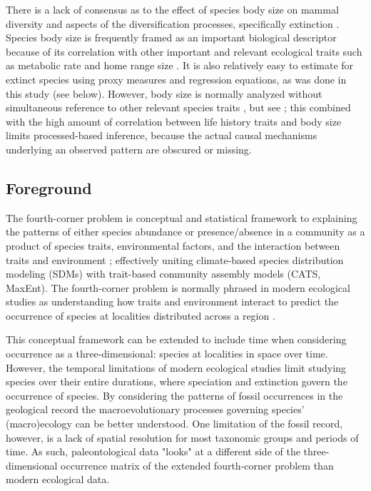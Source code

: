 \documentclass[12pt,letterpaper]{article}
\begin{document}
There is a lack of consensus as to the effect of species body size on mammal diversity and aspects of the diversification processes, specifically extinction \citep{Liow2008,Liow2009,Tomiya2013,Smits2015b}. Species body size is frequently framed as an important biological descriptor because of its correlation with other important and relevant ecological traits such as metabolic rate and home range size \citep{Brown1995}. It is also relatively easy to estimate for extinct species using proxy measures and regression equations, as was done in this study (see below). However, body size is normally analyzed without simultaneous reference to other relevant species traits \citep{Liow2008,Huang2017,Raia2012f,Smith2004}, but see \citep{Smits2015b}; this combined with the high amount of correlation between life history traits and body size limits processed-based inference, because the actual causal mechanisms underlying an observed pattern are obscured or missing.




\subsection*{Foreground}

The fourth-corner problem is conceptual and statistical framework to explaining the patterns of either species abundance or presence/absence in a community as a product of species traits, environmental factors, and the interaction between traits and environment \citep{Brown2014c,Warton2015a,Pollock2012,Jamil2013}; effectively uniting climate-based species distribution modeling (SDMs) with trait-based community assembly models (CATS, MaxEnt). The fourth-corner problem is normally phrased in modern ecological studies as understanding how traits and environment interact to predict the occurrence of species at localities distributed across a region \citep{Pollock2012,Jamil2013}. 

This conceptual framework can be extended to include time when considering occurrence as a three-dimensional: species at localities in space over time. However, the temporal limitations of modern ecological studies limit studying species over their entire durations, where speciation and extinction govern the occurrence of species. By considering the patterns of fossil occurrences in the geological record the macroevolutionary processes governing species' (macro)ecology can be better understood. One limitation of the fossil record, however, is a lack of spatial resolution for most taxonomic groups and periods of time. As such, paleontological data "looks" at a different side of the three-dimensional occurrence matrix of the extended fourth-corner problem than modern ecological data.
\end{document}
